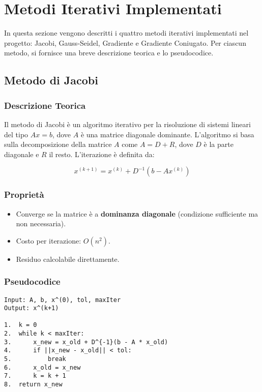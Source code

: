 \section{Metodi Iterativi Implementati}

In questa sezione vengono descritti i quattro metodi iterativi implementati nel progetto: Jacobi, Gauss-Seidel, Gradiente e Gradiente Coniugato. Per ciascun metodo, si fornisce una breve descrizione teorica e lo pseudocodice.

\subsection{Metodo di Jacobi}

\subsubsection*{Descrizione Teorica}

Il metodo di Jacobi è un algoritmo iterativo per la risoluzione di sistemi lineari del tipo $Ax = b$, dove $A$ è una matrice diagonale dominante. L'algoritmo si basa sulla decomposizione della matrice $A$ come $A = D + R$, dove $D$ è la parte diagonale e $R$ il resto. L'iterazione è definita da:

\[
x^{(k+1)} = x^{(k)} + D^{-1}(b - Ax^{(k)})
\]

\subsubsection*{Proprietà}
\begin{itemize}
    \item Converge se la matrice è a \textbf{dominanza diagonale} (condizione sufficiente ma non necessaria).
    \item Costo per iterazione: \(O(n^2)\).
    \item Residuo calcolabile direttamente.
\end{itemize}

\subsubsection*{Pseudocodice}

\begin{footnotesize}
\begin{verbatim}
Input: A, b, x^(0), tol, maxIter
Output: x^(k+1)

1.  k = 0
2.  while k < maxIter:
3.      x_new = x_old + D^{-1}(b - A * x_old)
4.      if ||x_new - x_old|| < tol:
5.          break
6.      x_old = x_new
7.      k = k + 1
8.  return x_new
\end{verbatim}
\end{footnotesize}

